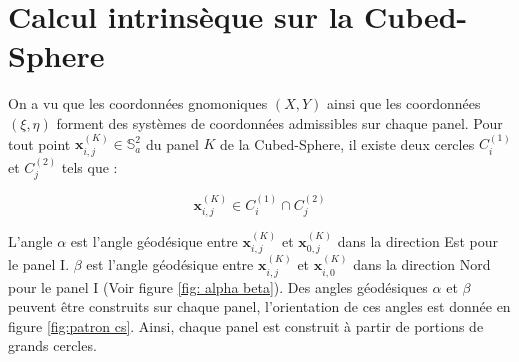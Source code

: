 
















\section{Calcul intrinsèque sur la Cubed-Sphere}

On a vu que les coordonnées gnomoniques $(X,Y)$ ainsi que les coordonnées $(\xi,\eta)$ forment des systèmes de coordonnées admissibles sur chaque panel.  Pour tout point $\mathbf{x}_{i,j}^{(K)} \in \mathbb{S}_a^2$ du panel $K$ de la Cubed-Sphere, il existe deux cercles $C_i^{(1)}$ et $C_j^{(2)}$ tels que :

\begin{equation}
\mathbf{x}_{i,j}^{(K)} \in C_i^{(1)} \cap C_j^{(2)}
\end{equation}

L'angle $\alpha$ est l'angle géodésique entre $\mathbf{x}_{i,j}^{(K)}$ et $\mathbf{x}_{0,j}^{(K)}$ dans la direction Est pour le panel I. $\beta$ est l'angle géodésique entre $\mathbf{x}_{i,j}^{(K)}$ et $\mathbf{x}_{i,0}^{(K)}$ dans la direction Nord pour le panel I (Voir figure \ref{fig: alpha beta}). Des angles géodésiques $\alpha$ et $\beta$ peuvent être construits sur chaque panel, l'orientation de ces angles est donnée en figure \ref{fig:patron cs}. Ainsi, chaque panel est construit à partir de portions de grands cercles.


